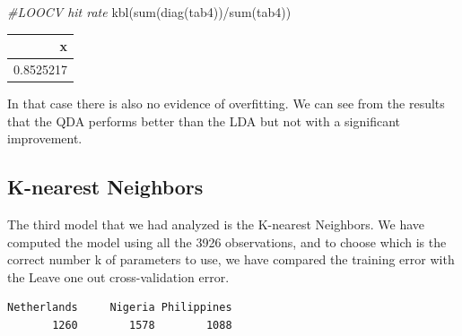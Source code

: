 \documentclass[
  11pt,
]{article}
\newenvironment{Shaded}{\begin{snugshade}}{\end{snugshade}}
\newcommand{\CommentTok}[1]{\textcolor[rgb]{0.56,0.35,0.01}{\textit{#1}}}
\newcommand{\FunctionTok}[1]{\textcolor[rgb]{0.00,0.00,0.00}{#1}}
\newcommand{\NormalTok}[1]{#1}
\newcommand{\SpecialCharTok}[1]{\textcolor[rgb]{0.00,0.00,0.00}{#1}}
\begin{document}
\begin{Shaded}
\begin{Highlighting}[]
\CommentTok{\#LOOCV hit rate}
\FunctionTok{kbl}\NormalTok{(}\FunctionTok{sum}\NormalTok{(}\FunctionTok{diag}\NormalTok{(tab4))}\SpecialCharTok{/}\FunctionTok{sum}\NormalTok{(tab4))}
\end{Highlighting}
\end{Shaded}

\begin{tabular}[t]{r}
\hline
x\\
\hline
0.8525217\\
\hline
\end{tabular}

In that case there is also no evidence of overfitting. We can see from the results that the QDA performs better than the LDA but not with a significant improvement.

\hypertarget{k-nearest-neighbors}{%
\subsection{K-nearest Neighbors}\label{k-nearest-neighbors}}

The third model that we had analyzed is the K-nearest Neighbors. We have computed the model using all the 3926 observations, and to choose which is the correct number k of parameters to use, we have compared the training error with the Leave one out cross-validation error.

\begin{Shaded}
\end{Shaded}

\begin{verbatim}
Netherlands     Nigeria Philippines 
       1260        1578        1088 
\end{verbatim}
\end{document}
